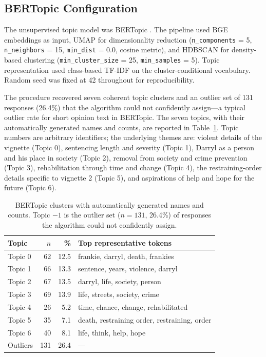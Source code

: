 \subsection{BERTopic Configuration}
\label{sec:supp_bertopic}

The unsupervised topic model was BERTopic \citep{grootendorst2022bertopic}. The pipeline used BGE embeddings as input, UMAP \citep{mcinnes2018umap} for dimensionality reduction (\texttt{n\_components} = 5, \texttt{n\_neighbors} = 15, \texttt{min\_dist} = 0.0, cosine metric), and HDBSCAN \citep{mcinnes2017hdbscan} for density-based clustering (\texttt{min\_cluster\_size} = 25, \texttt{min\_samples} = 5). Topic representation used class-based TF-IDF on the cluster-conditional vocabulary. Random seed was fixed at 42 throughout for reproducibility.

The procedure recovered seven coherent topic clusters and an outlier set of 131 responses (26.4\%) that the algorithm could not confidently assign---a typical outlier rate for short opinion text in BERTopic. The seven topics, with their automatically generated names and counts, are reported in Table~\ref{tab:supp_bertopic}. Topic numbers are arbitrary identifiers; the underlying themes are: violent details of the vignette (Topic 0), sentencing length and severity (Topic 1), Darryl as a person and his place in society (Topic 2), removal from society and crime prevention (Topic 3), rehabilitation through time and change (Topic 4), the restraining-order details specific to vignette 2 (Topic 5), and aspirations of help and hope for the future (Topic 6).

\begin{table}[htbp]
  \centering
  \caption{BERTopic clusters with automatically generated names and counts. Topic $-1$ is the outlier set ($n = 131$, 26.4\%) of responses the algorithm could not confidently assign.}
  \label{tab:supp_bertopic}
  \small
  \begin{tabular}{lrr l}
    \toprule
    Topic & $n$ & \% & Top representative tokens \\
    \midrule
    Topic 0  & 62 & 12.5 & frankie, darryl, death, frankies \\
    Topic 1  & 66 & 13.3 & sentence, years, violence, darryl \\
    Topic 2  & 67 & 13.5 & darryl, life, society, person \\
    Topic 3  & 69 & 13.9 & life, streets, society, crime \\
    Topic 4  & 26 & 5.2  & time, chance, change, rehabilitated \\
    Topic 5  & 35 & 7.1  & death, restraining order, restraining, order \\
    Topic 6  & 40 & 8.1  & life, think, help, hope \\
    Outliers & 131 & 26.4 & --- \\
    \bottomrule
  \end{tabular}
\end{table}

